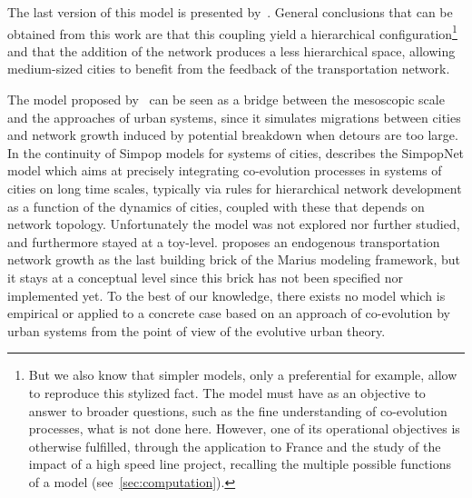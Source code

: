 The last version of this model is presented by~\cite{baptistemodeling}. General conclusions that can be obtained from this work are that this coupling yield a hierarchical configuration\footnote{But we also know that simpler models, only a preferential for example, allow to reproduce this stylized fact. The model must have as an objective to answer to broader questions, such as the fine understanding of co-evolution processes, what is not done here. However, one of its operational objectives is otherwise fulfilled, through the application to France and the study of the impact of a high speed line project, recalling the multiple possible functions of a model (see~\ref{sec:computation}).} and that the addition of the network produces a less hierarchical space, allowing medium-sized cities to benefit from the feedback of the transportation network.


The model proposed by~\cite{blumenfeld2010network} can be seen as a bridge between the mesoscopic scale and the approaches of urban systems, since it simulates migrations between cities and network growth induced by potential breakdown when detours are too large. In the continuity of Simpop models for systems of cities, \cite{schmitt2014modelisation} describes the SimpopNet model which aims at precisely integrating co-evolution processes in systems of cities on long time scales, typically via rules for hierarchical network development as a function of the dynamics of cities, coupled with these that depends on network topology. Unfortunately the model was not explored nor further studied, and furthermore stayed at a toy-level. \cite{cottineau2014evolution} proposes an endogenous transportation network growth as the last building brick of the Marius modeling framework, but it stays at a conceptual level since this brick has not been specified nor implemented yet. To the best of our knowledge, there exists no model which is empirical or applied to a concrete case based on an approach of co-evolution by urban systems from the point of view of the evolutive urban theory.



